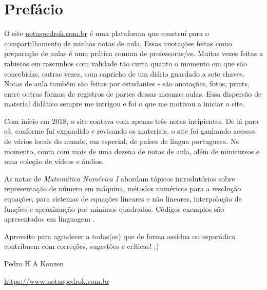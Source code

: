 

\chapter*{Prefácio}\label{prefacio}

O site \href{https://www.notaspedrok.com.br}{notaspedrok.com.br} é uma plataforma que construí para o compartilhamento de minhas notas de aula. Essas anotações feitas como preparação de aulas é uma prática comum de professoras/es. Muitas vezes feitas a rabiscos em rascunhos com validade tão curta quanto o momento em que são concebidas, outras vezes, com capricho de um diário guardado a sete chaves. Notas de aula também são feitas por estudantes - são anotações, fotos, prints, entre outras formas de registros de partes dessas mesmas aulas. Essa dispersão de material didático sempre me intrigou e foi o que me motivou a iniciar o site.

Com início em 2018, o site contava com apenas três notas incipientes. De lá para cá, conforme fui expandido e revisando os materiais, o site foi ganhando acessos de vários locais do mundo, em especial, de países de língua portuguesa. No momento, conta com mais de uma dezena de notas de aula, além de minicursos e uma coleção de vídeos e áudios.

As notas de \emph{Matemática Numérica I} abordam tópicos introdutórios sobre representação de número em máquina, métodos numéricos para a resolução equações, para sistemas de equações lineares e não lineares, interpolação de funções e aproximação por mínimos quadrados. Códigos exemplos são apresentados em linguagem {\python}.

Aproveito para agradecer a todas(os) que de forma assídua ou esporádica contribuem com correções, sugestões e críticas! ;)

\begin{flushright}
  Pedro H A Konzen

  \url{https://www.notaspedrok.com.br}
\end{flushright}
